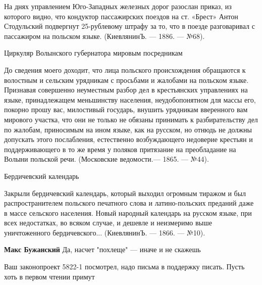 \begin{itemize}
\begin{itemize}
На днях управлением Юго-Западных железных дорог разослан приказ, из которого
видно, что кондуктор пассажирских поездов на ст. «Брест» Антон Стодульский
подвергнут 25-рублевому штрафу за то, что в поезде разговаривал с пассажиром на
польском языке. (КиевлянинЪ. — 1886. — №68).

Циркуляр Волынского губернатора мировым посредникам

До сведения моего доходит, что лица польского происхождения обращаются к
волостным и сельским урядникам с просьбами и жалобами на польском языке.
Признавая совершенно неуместным разбор дел в крестьянских управлениях на языке,
принадлежащем меньшинству населения, неудобопонятном для массы его, покорно
прошу вас, милостивый государь, внушить урядникам вверенного вам мирового
участка, что они не только не обязаны принимать к разбирательству дел по
жалобам, приносимым на ином языке, как на русском, но отнюдь не должны
допускать этого послабления, естественно возбуждающего недоверие крестьян и
поддерживающего в то же время у поляков притязание на преобладание на Волыни
польской речи. (Московские ведомости.— 1865. — №44).

Бердичевский календарь

Закрыли бердичевский календарь, который выходил огромным тиражом и был
распространителем польского печатного слова и латино-польских преданий даже в
массе сельского населения. Новый народный календарь на русском языке, при всех
недостатках, во всяком случае, и дешевле и неизмеримо выше уничтоженного
бердичевского... (КиевлянинЪ. — 1866. — №10).


 
\textbf{Макс Бужанский} Да, насчет "похлеще" — иначе и не скажешь
\end{itemize}

 
Ваш законопроект 5822-1 посмотрел, надо письма в поддержку писать. Пусть хоть в первом чтении примут

 

\end{itemize}
